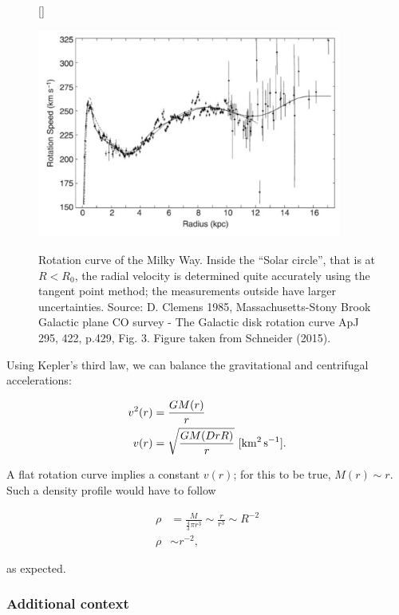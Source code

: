 \documentclass[a4paper,10pt]{article}
\begin{document}
\begin{figure}[h]
    [\FBwidth]
    {\caption{\footnotesize{Rotation curve of the Milky Way. Inside the ``Solar circle'', that is at $R<R_0$, the radial velocity is determined quite accurately using the tangent point method; the measurements outside have larger uncertainties. Source: D. Clemens 1985, Massachusetts-Stony Brook Galactic plane CO survey - The Galactic disk rotation curve ApJ 295, 422, p.429, Fig. 3. Figure taken from Schneider (2015).}}
    \label{fig:rotationcurve}}
    {\includegraphics[width=10cm]{figures/RotationCurve.png}}
\end{figure}

{\noindent}Using Kepler's third law, we can balance the gravitational and centrifugal accelerations:

\begin{align*}
    v^2(r) &= \frac{GM(r)}{r} \\
    v(r) &= \sqrt{\frac{GM(DrR)}{r}} ~ [{\rm km^2\,s^{-1}}].
\end{align*}

{\noindent}A flat rotation curve implies a constant $v(r)$; for this to be true, $M(r)\sim r$. Such a density profile would have to follow

\begin{align*}
    \rho &= \frac{M}{\frac{4}{3}\pi r^3}  \sim \frac{r}{r^3} \sim R^{-2} \\
    \rho &\sim r^{-2},
\end{align*}

{\noindent}as expected.

\subsubsection{Additional context}
\end{document}
